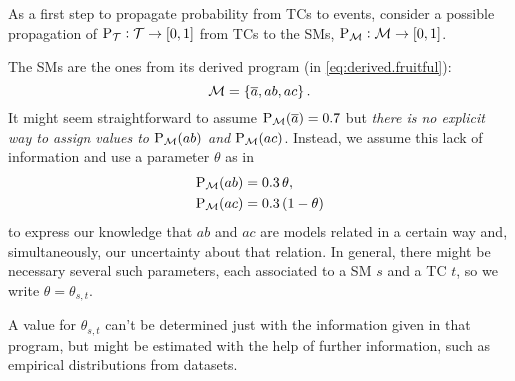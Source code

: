 \documentclass{article}
\begin{document}
As a first step to propagate probability from \aclp{TC} to
events, consider a possible
propagation of \(\prT:\TCHOICEset \to \intcc{0,1}\) from \aclp{TC}
to the \aclp{SM}, \(\prM:\MODELset \to \intcc{0,1}\).

The \aclp{SM} are the ones from its derived program (in
\cref{eq:derived.fruitful}):
\[ {\cal M} = \set{\ensuremath{\overline{a}}, ab, ac}. \]
It might seem straightforward to assume \(\prM\at{\co{a}}=0.7\) but
\emph{there is no explicit way to assign values to \(\prM\at{ab}\) and
	\(\prM\at{ac}\)}.  Instead, we assume this lack of information and use a
parameter \(\theta\) as in
\begin{equation*}
	\begin{aligned}
		\prM\at{ab} & = 0.3\, \theta, \\
		\prM\at{ac} & = 0.3\, (1 - \theta)
	\end{aligned}
\end{equation*}
to express our knowledge that $ab$ and $ac$ are models related in a
certain way and, simultaneously, our uncertainty about that
relation.  In general, there might be necessary several such
parameters, each associated to a \acl{SM} \(s\) and a \acl{TC}
\(t\), so we write \(\theta=\theta_{s,t}\).

A value for \(\theta_{s,t}\) can't be determined just with the
information given in that program, but might be estimated with the
help of further information, such as empirical distributions from
datasets.
\end{document}
